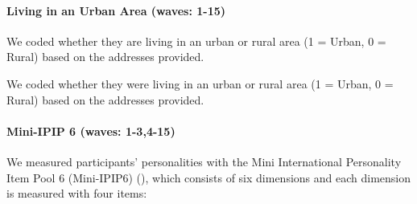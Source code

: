 \documentclass[
  single column]{article}
\let\oldparagraph\paragraph
\renewcommand{\paragraph}[1]{\oldparagraph{#1}\mbox{}}
\begin{document}
\paragraph{Living in an Urban Area (waves:
1-15)}\label{living-in-an-urban-area-waves-1-15}

We coded whether they are living in an urban or rural area (1 = Urban, 0
= Rural) based on the addresses provided.

We coded whether they were living in an urban or rural area (1 = Urban,
0 = Rural) based on the addresses provided.

\paragraph{Mini-IPIP 6 (waves:
1-3,4-15)}\label{mini-ipip-6-waves-1-34-15}

We measured participants' personalities with the Mini International
Personality Item Pool 6 (Mini-IPIP6) (), which consists of six dimensions and each
dimension is measured with four items:
\end{document}
